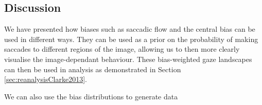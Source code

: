 \subsection{Discussion}

We have presented how biases such as saccadic flow and the central bias can be used in different ways. They can be used as a prior on the probability of making saccades to different regions of the image, allowing us to then more clearly visualise the image-dependant behaviour. These bias-weighted gaze landscapes can then be used in analysis as demonstrated in Section \ref{sec:reanalysisClarke2013}.

We can also use the bias distributions to generate data

